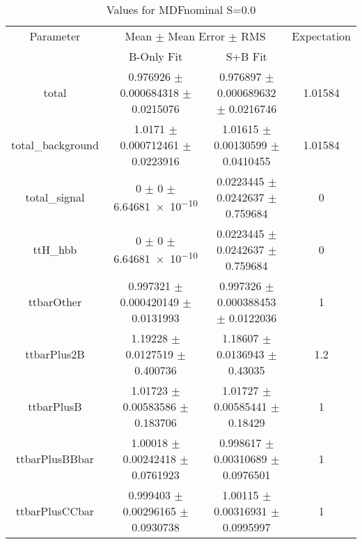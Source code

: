 \begin{table}
\centering
\caption{Values for MDFnominal S=0.0}
\begin{tabular}{cccc}
\toprule
Parameter & \multicolumn{2}{c}{Mean $\pm$ Mean Error $\pm$ RMS} & Expectation\\
 & B-Only Fit & S+B Fit & \\
\midrule
total & \num{0.976926} $\pm$ \num{0.000684318} $\pm$ \num{0.0215076} & \num{0.976897} $\pm$ \num{0.000689632} $\pm$ \num{0.0216746} & \num{1.01584}\\
total\_background & \num{1.0171} $\pm$ \num{0.000712461} $\pm$ \num{0.0223916} & \num{1.01615} $\pm$ \num{0.00130599} $\pm$ \num{0.0410455} & \num{1.01584}\\
total\_signal & \num{0} $\pm$ \num{0} $\pm$ \num{6.64681e-10} & \num{0.0223445} $\pm$ \num{0.0242637} $\pm$ \num{0.759684} & \num{0}\\
ttH\_hbb & \num{0} $\pm$ \num{0} $\pm$ \num{6.64681e-10} & \num{0.0223445} $\pm$ \num{0.0242637} $\pm$ \num{0.759684} & \num{0}\\
ttbarOther & \num{0.997321} $\pm$ \num{0.000420149} $\pm$ \num{0.0131993} & \num{0.997326} $\pm$ \num{0.000388453} $\pm$ \num{0.0122036} & \num{1}\\
ttbarPlus2B & \num{1.19228} $\pm$ \num{0.0127519} $\pm$ \num{0.400736} & \num{1.18607} $\pm$ \num{0.0136943} $\pm$ \num{0.43035} & \num{1.2}\\
ttbarPlusB & \num{1.01723} $\pm$ \num{0.00583586} $\pm$ \num{0.183706} & \num{1.01727} $\pm$ \num{0.00585441} $\pm$ \num{0.18429} & \num{1}\\
ttbarPlusBBbar & \num{1.00018} $\pm$ \num{0.00242418} $\pm$ \num{0.0761923} & \num{0.998617} $\pm$ \num{0.00310689} $\pm$ \num{0.0976501} & \num{1}\\
ttbarPlusCCbar & \num{0.999403} $\pm$ \num{0.00296165} $\pm$ \num{0.0930738} & \num{1.00115} $\pm$ \num{0.00316931} $\pm$ \num{0.0995997} & \num{1}\\
\bottomrule
\end{tabular}
\end{table}